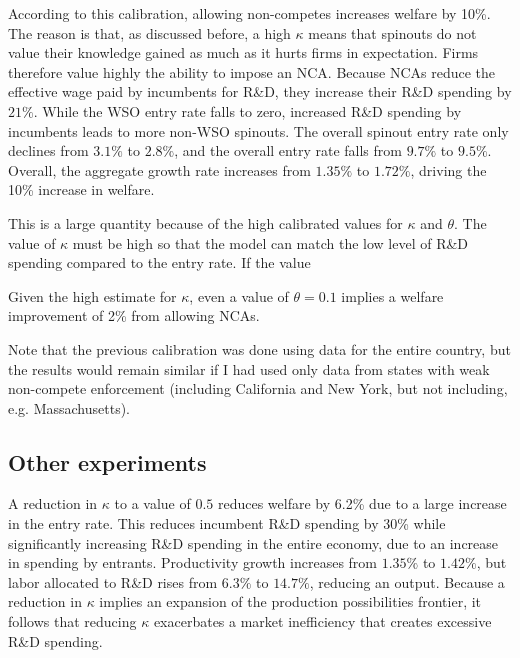 \documentclass[12pt,english]{article}
\theoremstyle{remark}
\begin{document}
According to this calibration, allowing non-competes increases welfare by 10\%. The reason is that, as discussed before, a high $\kappa$ means that spinouts do not value their knowledge gained as much as it hurts firms in expectation. Firms therefore value highly the ability to impose an NCA. Because NCAs reduce the effective wage paid by incumbents for R\&D, they increase their R\&D spending by $21\%$. While the WSO entry rate falls to zero, increased R\&D spending by incumbents leads to more non-WSO spinouts. The overall spinout entry rate only declines from $3.1\%$ to $2.8\%$, and the overall entry rate falls from $9.7\%$ to $9.5\%$. Overall, the aggregate growth rate increases from $1.35\%$ to $1.72\%$, driving the 10\% increase in welfare.

This is a large quantity because of the high calibrated values for $\kappa$ and $\theta$. The value of $\kappa$ must be high so that the model can match the low level of R\&D spending compared to the entry rate. If the value 

Given the high estimate for $\kappa$, even a value of $\theta = 0.1$ implies a welfare improvement of 2\% from allowing NCAs. 

Note that the previous calibration was done using data for the entire country, but the results would remain similar if I had used only data from states with weak non-compete enforcement (including California and New York, but not including, e.g. Massachusetts). 

\subsection{Other experiments}

A reduction in $\kappa$ to a value of $0.5$ reduces welfare by 6.2\% due to a large increase in the entry rate. This reduces incumbent R\&D spending by 30\% while significantly increasing R\&D spending in the entire economy, due to an increase in spending by entrants. Productivity growth increases from $1.35\%$ to $1.42\%$, but labor allocated to R\&D rises from $6.3\%$ to $14.7\%$, reducing an output. Because a reduction in $\kappa$ implies an expansion of the production possibilities frontier, it follows that reducing $\kappa$ exacerbates a market inefficiency that creates excessive R\&D spending. 
\end{document}
